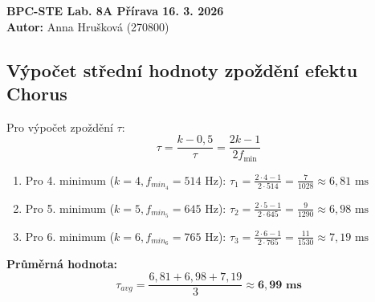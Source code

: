 \documentclass[12pt, a4paper]{article}
\begin{document}
\begin{center}
    {\large \textbf{BPC-STE Lab. 8A Přírava 16. 3. 2026}}\\[0.15cm]
    {\large \textbf{Autor:} Anna Hrušková (270800)}\\[0.15cm]
\end{center}
\vspace{0.4cm} %

\subsection*{Výpočet střední hodnoty zpoždění efektu Chorus}

Pro výpočet zpoždění $\tau$:
\begin{equation}
\tau =  \frac{k - 0,5}{\tau} = \frac{2k - 1}{2f_{\min}}
\end{equation}

\begin{enumerate}
    \item Pro 4. minimum ($k=4, f_{min_4}=514$ Hz): 
    $\tau_1 = \frac{2 \cdot 4 - 1}{2 \cdot 514} = \frac{7}{1028} \approx 6,81 \text{ ms}$
    
    \item Pro 5. minimum ($k=5, f_{min_5}=645$ Hz): 
    $\tau_2 = \frac{2 \cdot 5 - 1}{2 \cdot 645} = \frac{9}{1290} \approx 6,98 \text{ ms}$
    
    \item Pro 6. minimum ($k=6, f_{min_6}=765$ Hz):
    $\tau_3 = \frac{2 \cdot 6 - 1}{2 \cdot 765} = \frac{11}{1530} \approx 7,19 \text{ ms}$
\end{enumerate}

\textbf{Průměrná hodnota:}
\begin{equation}
\tau_{avg} = \frac{6,81 + 6,98 + 7,19}{3} \approx \mathbf{6,99 \text{ ms}}
\end{equation}




\printbibliography[title={Seznam použité literatury}]
\end{document}
